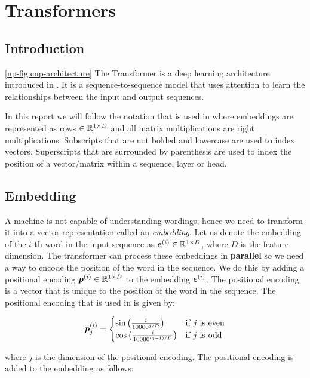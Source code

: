 \documentclass[../../main.tex]{subfiles}
\begin{document}
\section{Transformers}
\subsection{Introduction}
\autoref{np-fig:cnp-architecture}
The Transformer is a deep learning architecture introduced in \parencite{vaswani2017attention}. It is a sequence-to-sequence model that uses attention to learn the relationships between the input and output sequences.

In this report we will follow the notation that is used in \parencite{vaswani2017attention} where embeddings are represented as rows $\in \mathbb{R}^{1 \times D}$ and all matrix multiplications are right multiplications. Subscripts that are not bolded and lowercase are used to index vectors. Superscripts that are surrounded by parenthesis are used to index the position of a vector/matrix within a sequence, layer or head. 

\subsection{Embedding}

A machine is not capable of understanding wordings, hence we need to transform it into a vector representation called an \emph{embedding}. Let us denote the embedding of the $i$-th word in the input sequence as $\bm{e}^{(i)} \in \mathbb{R}^{1 \times D}$, where $D$ is the feature dimension. The transformer can process these embeddings in \textbf{parallel} so we need a way to encode the position of the word in the sequence. We do this by adding a positional encoding $\bm{p}^{(i)} \in \mathbb{R}^{1 \times D}$ to the embedding $\bm{e}^{(i)}$. The positional encoding is a vector that is unique to the position of the word in the sequence. The positional encoding that is used in \parencite{vaswani2017attention} is given by:

\begin{equation}
	\label{pe}
	\bm{p}_j^{(i)} = \begin{cases}
		\sin\left(\frac{i}{10000^{j/D}}\right) & \text{if } j \text{ is even} \\
		\cos\left(\frac{i}{10000^{(j-1)/D}}\right) & \text{if } j \text{ is odd}
	\end{cases}
\end{equation}

\noi where $j$ is the dimension of the positional encoding. The positional encoding is added to the embedding as follows:
\end{document}
